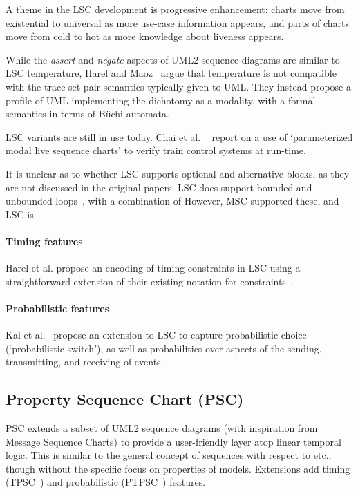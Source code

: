 A theme in the LSC development is progressive enhancement: charts move
from existential to universal as more use-case information appears,
and parts of charts move from cold to hot as more knowledge about
liveness appears.

While the \emph{assert} and \emph{negate} aspects of UML2 sequence diagrams
are similar to LSC temperature, Harel and Maoz~\cite{Harel08-ModalSD} argue
that temperature is not compatible with the trace-set-pair semantics typically
given to UML.  They instead propose a profile of UML implementing the
dichotomy as a modality, with a formal semantics in terms of B\"uchi automata.

LSC variants are still in use today. 
Chai et al. ~\cite{Chai21-PMLSC} report on a use of `parameterized modal
live sequence charts' to verify train control systems at run-time.

\begin{remark}
It is unclear as to whether LSC supports optional and
alternative blocks,
as they are not discussed in the original papers.
LSC does support bounded and unbounded loops~\cite{Harel03-MSC}, with a combination of
However, MSC supported these, and LSC is 
\end{remark}

\paragraph{Timing features}
Harel et al. propose an encoding of timing constraints in LSC using a
straightforward extension of their existing notation for
constraints~\cite{Harel03-MSC}.

\paragraph{Probabilistic features}
Kai et al.~\cite{Kai14-PLSC} propose an extension to LSC to capture
probabilistic choice (`probabilistic switch'), as well as
probabilities over aspects of the sending, transmitting, and receiving
of events.

\subsection{Property Sequence Chart (PSC)}

PSC extends a subset of UML2 sequence diagrams (with inspiration from
Message Sequence Charts) to provide a
user-friendly layer atop linear temporal logic.  This is
similar to the general concept of \langname{} sequences with respect to \tockcsp{}
etc., though without the
specific focus on properties of \robochart{} models.
Extensions add timing (TPSC~\cite{tpsc}) and
probabilistic (PTPSC~\cite{ptpsc}) features.

